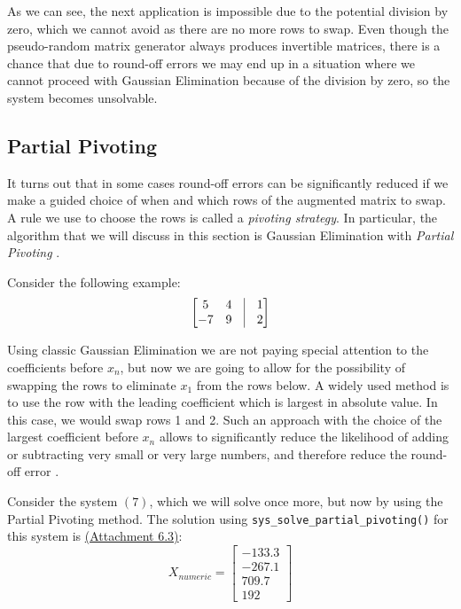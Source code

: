\documentclass[letterpaper,12pt]{article}
\begin{document}
As we can see, the next application is impossible due to the potential division by zero, which we cannot avoid as there are no more rows to swap. Even though the pseudo-random matrix generator always produces invertible matrices, there is a chance that due to round-off errors we may end up in a situation where we cannot proceed with Gaussian Elimination because of the division by zero, so the system becomes unsolvable.


\subsection{Partial Pivoting}

It turns out that in some cases round-off errors can be significantly reduced if we make a guided choice of when and which rows of the augmented matrix to swap. A rule we use to choose the rows is called a \textit{pivoting strategy}. In particular, the algorithm that we will discuss in this section is Gaussian Elimination with \textit{Partial Pivoting} \cite{pp}.

Consider the following example:
\begin{equation}
    \begin{bmatrix}
        5  &  4 & \vrule  &  1\\
        -7 &  9 & \vrule  &  2
    \end{bmatrix}
\end{equation}

Using classic Gaussian Elimination we are not paying special attention to the coefficients before $x_n$, but now we are going to allow for the possibility of swapping the rows to eliminate $x_1$ from the rows below. A widely used method is to use the row with the leading coefficient which is largest in absolute value. In this case, we would swap rows 1 and 2. Such an approach with the choice of the largest coefficient before $x_n$ allows to significantly reduce the likelihood of adding or subtracting very small or very large numbers, and therefore reduce the round-off error \cite{pp, ppround}.

Consider the system $(7)$, which we will solve once more, but now by using the Partial Pivoting method. The solution using \verb|sys_solve_partial_pivoting()| for this system is \hyperref[a:E3]{(Attachment 6.3)}:
\begin{equation}
        X_{numeric} = 
    \begin{bmatrix}
         -133.3\\
         -267.1\\
         709.7\\
         192 
    \end{bmatrix}
\end{equation}
\end{document}
